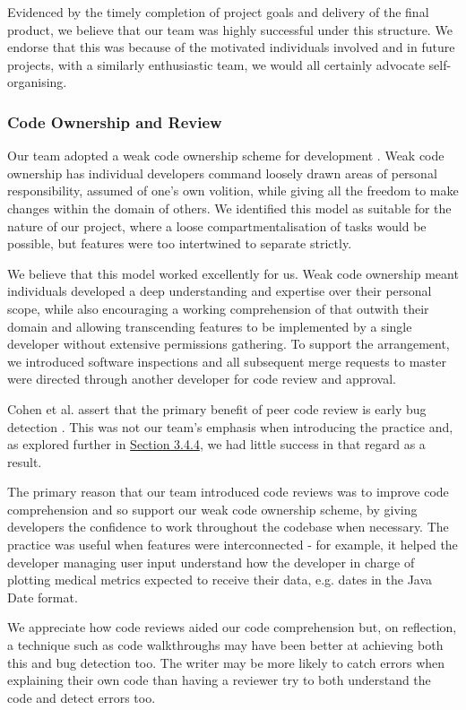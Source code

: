 \documentclass{l3proj}
\begin{document}
Evidenced by the timely completion of project goals and delivery of the final product, we believe that our team was highly successful under this structure. We endorse that this was because of the  motivated individuals involved and in future projects, with a similarly enthusiastic team, we would all certainly advocate self-organising. 


\subsubsection{Code Ownership and Review} \label{sec:3.2.3}
Our team adopted a weak code ownership scheme for development \cite{CodeOwnership}. Weak code ownership has individual developers command loosely drawn areas of personal responsibility, assumed of one's own volition, while giving all the freedom to make changes within the domain of others. We identified this model as suitable for the nature of our project, where a loose compartmentalisation of tasks would be possible, but features were too intertwined to separate strictly.

We believe that this model worked excellently for us. Weak code ownership meant individuals developed a deep understanding and expertise over their personal scope, while also encouraging a working comprehension of that outwith their domain and allowing transcending features to be implemented by a single developer without extensive permissions gathering. To support the arrangement, we introduced software inspections and all subsequent merge requests to master were directed through another developer for code review and approval.

Cohen et al. assert that the primary benefit of peer code review is early bug detection \cite[p9-16]{CodeReview}. This was not our team's emphasis when introducing the practice and, as explored further in \hyperref[sec:3.4.4]{Section 3.4.4}, we had little success in that regard as a result.

The primary reason that our team introduced code reviews was to improve code comprehension and so support our weak code ownership scheme, by giving developers the confidence to work throughout the codebase when necessary. The practice was useful when features were interconnected - for example, it helped the developer managing user input understand how the developer in charge of plotting medical metrics expected to receive their data, e.g. dates in the Java Date format. 

We appreciate how code reviews aided our code comprehension but, on reflection, a technique such as code walkthroughs \cite{Walkthroughs} may have been better at achieving both this and bug detection too. The writer may be more likely to catch errors when explaining their own code than having a reviewer try to both understand the code and detect errors too.
\end{document}

